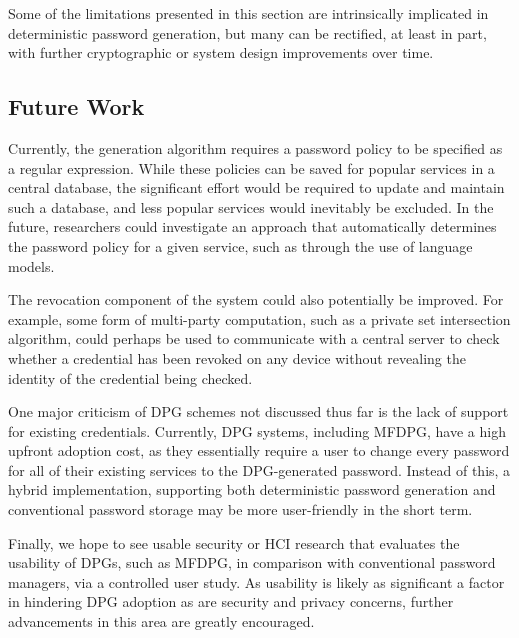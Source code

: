 Some of the limitations presented in this section are intrinsically implicated in deterministic password generation, but many can be rectified, at least in part, with further cryptographic or system design improvements over time.

\subsection{Future Work}

Currently, the generation algorithm requires a password policy to be specified as a regular expression. While these policies can be saved for popular services in a central database, the significant effort would be required to update and maintain such a database, and less popular services would inevitably be excluded. In the future, researchers could investigate an approach that automatically determines the password policy for a given service, such as through the use of language models.

The revocation component of the system could also potentially be improved. For example, some form of multi-party computation, such as a private set intersection algorithm, could perhaps be used to communicate with a central server to check whether a credential has been revoked on any device without revealing the identity of the credential being checked.

One major criticism of DPG schemes not discussed thus far is the lack of support for existing credentials. Currently, DPG systems, including MFDPG, have a high upfront adoption cost, as they essentially require a user to change every password for all of their existing services to the DPG-generated password.
Instead of this, a hybrid implementation, supporting both deterministic password generation and conventional password storage may be more user-friendly in the short term.

Finally, we hope to see usable security or HCI research that evaluates the usability of DPGs, such as MFDPG, in comparison with conventional password managers, via a controlled user study. As usability is likely as significant a factor in hindering DPG adoption as are security and privacy concerns, further advancements in this area are greatly encouraged.

\eject
